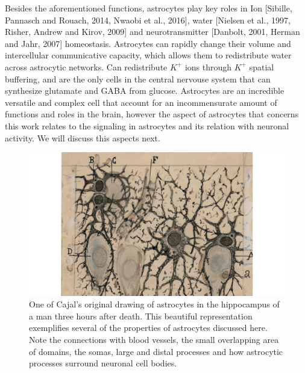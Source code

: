 Besides the aforementioned functions, astrocytes play key roles in Ion [Sibille, Pannasch and Rouach, 2014, Nwaobi et al., 2016], water [Nielsen et al., 1997, Risher, Andrew and Kirov, 2009] and neurotransmitter [Danbolt, 2001, Herman and Jahr, 2007] homeostasis. 
Astrocytes can rapidly change their volume and intercellular communicative capacity, which allows them to redistribute water across astrocytic networks.  
Can redistribute $K^+$ ions through $K^+$ spatial buffering, and are the only cells in the central nervouse system that can synthesize glutamate and GABA from glucose. 
Astrocytes are an incredible versatile and complex cell that account for an incommensurate amount of functions and roles in the brain, however the aspect of astrocytes that concerns this work relates to the signaling in astrocytes and its relation with neuronal activity. 
We will discuss this aspects next. 
\begin{figure}
    \centering
    \includegraphics[width=\textwidth]{Figures/Chapter1/intro_fig_astro_cajal.pdf}
    \caption{One of Cajal's original drawing of astrocytes in the hippocampus of a man three hours after death. This beautiful representation exemplifies several of the properties of astrocytes discussed here. Note the connections with blood vessels, the small overlapping area of domains, the somas, large and distal processes and how astrocytic processes surround neuronal cell bodies.}
    \label{fig:chap1:astro_anatomy_cajal}
\end{figure}
